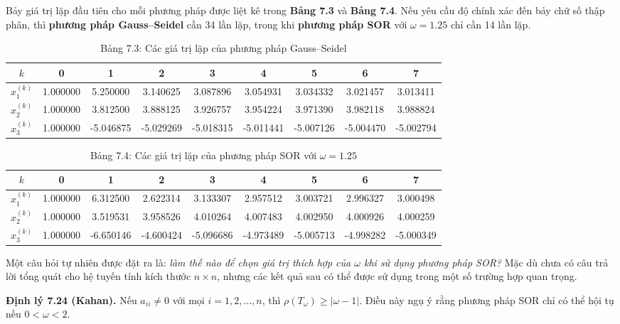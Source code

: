 Bảy giá trị lặp đầu tiên cho mỗi phương pháp được liệt kê trong \textbf{Bảng 7.3} và \textbf{Bảng 7.4}.  
Nếu yêu cầu độ chính xác đến bảy chữ số thập phân, 
thì \textbf{phương pháp Gauss--Seidel} cần 34 lần lặp, 
trong khi \textbf{phương pháp SOR} với \( \omega = 1.25 \) chỉ cần 14 lần lặp.

\begin{table}[h!]
\centering
\caption{Bảng 7.3: Các giá trị lặp của phương pháp Gauss--Seidel}
\begin{tabular}{ccccccccc}
\hline
$k$ & 0 & 1 & 2 & 3 & 4 & 5 & 6 & 7 \\ \hline
$x_1^{(k)}$ & 1.000000 & 5.250000 & 3.140625 & 3.087896 & 3.054931 & 3.034332 & 3.021457 & 3.013411 \\
$x_2^{(k)}$ & 1.000000 & 3.812500 & 3.888125 & 3.926757 & 3.954224 & 3.971390 & 3.982118 & 3.988824 \\
$x_3^{(k)}$ & 1.000000 & -5.046875 & -5.029269 & -5.018315 & -5.011441 & -5.007126 & -5.004470 & -5.002794 \\
\hline
\end{tabular}
\end{table}

\begin{table}[h!]
\centering
\caption{Bảng 7.4: Các giá trị lặp của phương pháp SOR với $\omega = 1.25$}
\begin{tabular}{ccccccccc}
\hline
$k$ & 0 & 1 & 2 & 3 & 4 & 5 & 6 & 7 \\ \hline
$x_1^{(k)}$ & 1.000000 & 6.312500 & 2.622314 & 3.133307 & 2.957512 & 3.003721 & 2.996327 & 3.000498 \\
$x_2^{(k)}$ & 1.000000 & 3.519531 & 3.958526 & 4.010264 & 4.007483 & 4.002950 & 4.000926 & 4.000259 \\
$x_3^{(k)}$ & 1.000000 & -6.650146 & -4.600424 & -5.096686 & -4.973489 & -5.005713 & -4.998282 & -5.000349 \\
\hline
\end{tabular}
\end{table}

Một câu hỏi tự nhiên được đặt ra là: 
\textit{làm thế nào để chọn giá trị thích hợp của \( \omega \) khi sử dụng phương pháp SOR?}  
Mặc dù chưa có câu trả lời tổng quát cho hệ tuyến tính kích thước \( n \times n \), 
nhưng các kết quả sau có thể được sử dụng trong một số trường hợp quan trọng.

\textbf{Định lý 7.24 (Kahan).}  
Nếu \( a_{ii} \neq 0 \) với mọi \( i = 1, 2, \ldots, n \), 
thì \( \rho(T_\omega) \geq |\omega - 1| \).  
Điều này ngụ ý rằng phương pháp SOR chỉ có thể hội tụ nếu \( 0 < \omega < 2. \)

